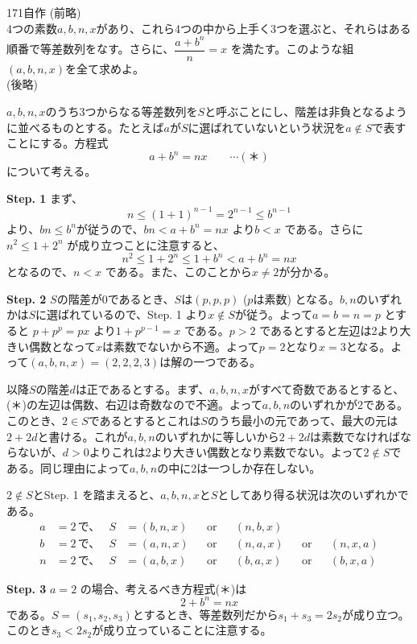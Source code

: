 \begin{thm}{171}{}{自作}
 (前略) \\
 4つの素数$a, b, n, x$があり、これら4つの中から上手く3つを選ぶと、それらはある順番で等差数列をなす。さらに、$\dfrac{a+b^n}{n}=x$ を満たす。このような組$(a, b, n, x)$を全て求めよ。 \\
 (後略)
\end{thm}

$a,b,n,x$のうち3つからなる等差数列を$S$と呼ぶことにし、階差は非負となるように並べるものとする。たとえば$a$が$S$に選ばれていないという状況を$a\notin S$で表すことにする。方程式
\[ a+b^n=nx \qquad\cdots(\text{＊}) \]
について考える。

{\bf \large Step. 1} まず、
\[ n\le (1+1)^{n-1}=2^{n-1}\le b^{n-1} \]
より、$bn\le b^n$が従うので、$bn<a+b^n=nx$ より$b<x$ である。さらに$n^2\le 1+2^n$ が成り立つことに注意すると、
\[ n^2\le 1+2^n\le 1+b^n < a+b^n =nx \]
となるので、$n<x$ である。また、このことから$x\neq 2$が分かる。

{\bf \large Step. 2} $S$の階差が0であるとき、$S$は$(p,p,p)$ ($p$は素数) となる。$b,n$のいずれかは$S$に選ばれているので、Step. 1 より$x\notin S$が従う。よって$a=b=n=p$ とすると $p+p^p=px$ より$1+p^{p-1}=x$ である。$p>2$ であるとすると左辺は2より大きい偶数となって$x$は素数でないから不適。よって$p=2$となり$x=3$となる。よって$(a,b,n,x)=(2,2,2,3)$は解の一つである。

\vspace{1zw}

以降$S$の階差$d$は正であるとする。まず、$a,b,n,x$がすべて奇数であるとすると、(＊)の左辺は偶数、右辺は奇数なので不適。よって$a,b,n$のいずれかが2である。このとき、$2\in S$であるとするとこれは$S$のうち最小の元であって、最大の元は$2+2d$と書ける。これが$a,b,n$のいずれかに等しいから$2+2d$は素数でなければならないが、$d>0$よりこれは2より大きい偶数となり素数でない。よって$2\notin S$である。同じ理由によって$a,b,n$の中に2は一つしか存在しない。

$2\notin S$とStep. 1 を踏まえると、$a,b,n,x$と$S$としてあり得る状況は次のいずれかである。
\begin{align*}
 a&=2 \,\text{で、}& S&=(b,n,x) & &\text{or} & &(n,b,x) & & & &\\
 b&=2 \,\text{で、}& S&=(a,n,x) & &\text{or} & &(n,a,x) & &\text{or} & &(n,x,a) \\
 n&=2 \,\text{で、}& S&=(a,b,x) & &\text{or} & &(b,a,x) & &\text{or} & &(b,x,a)
\end{align*}

{\bf \large Step. 3} $a=2$ の場合、考えるべき方程式(＊)は
\[ 2+b^n=nx \]
である。$S=(s_1,s_2,s_3)$とするとき、等差数列だから$s_1+s_3=2s_2$が成り立つ。このとき$s_3<2s_2$が成り立っていることに注意する。

